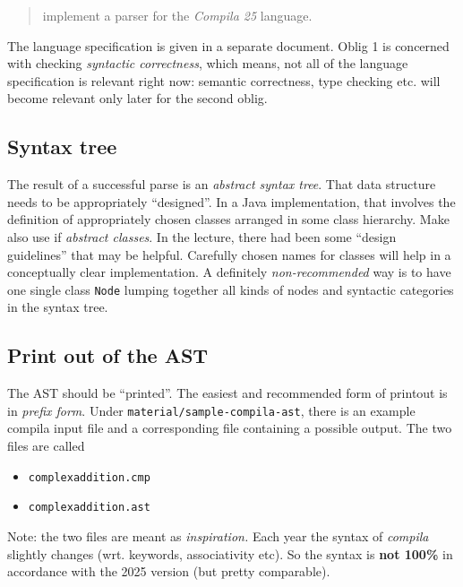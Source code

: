 \documentclass[10pt,freeform]{handout}[2014/08/13]
\begin{document}
\begin{quote}
  implement a parser for the \textsl{Compila 25} language.
\end{quote}
The language specification is given in a separate document. Oblig 1 is
concerned with checking \emph{syntactic correctness}, which means, not all
of the language specification is relevant right now: semantic correctness,
type checking etc. will become relevant only later for the second oblig.


\subsection{Syntax tree}
\label{sec:syntax-tree}

The result of a successful parse is an \emph{abstract syntax tree}. That
data structure needs to be appropriately ``designed''. In a Java
implementation, that involves the definition of appropriately chosen
classes arranged in some class hierarchy. Make also use if \emph{abstract
  classes}. In the lecture, there had been some ``design guidelines'' that
may be helpful. Carefully chosen names for classes will help in a
conceptually clear implementation. A definitely \emph{non-recommended} way
is to have one single class \texttt{Node} lumping together all kinds of
nodes and syntactic categories in the syntax tree.









\subsection{Print out of the AST}
\label{sec:print-out-ast}


The AST should be ``printed''. The easiest and recommended form of printout
is in \emph{prefix form}. Under \texttt{material/sample-compila-ast}, there
is an example compila input file and a corresponding file containing a
possible output. The two files are called

\begin{itemize}
\item \texttt{complexaddition.cmp}
\item \texttt{complexaddition.ast}
\end{itemize}


Note: the two files are meant as \emph{inspiration.} Each year the syntax
of \textsl{compila} slightly changes (wrt. keywords, associativity etc). So
the syntax is \textbf{not 100\%} in accordance with the 2025 version (but
pretty comparable).
\end{document}
